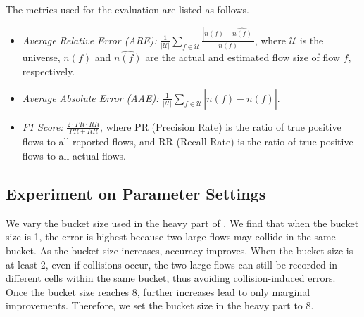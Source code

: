 %
The metrics used for the evaluation are listed as follows.
\begin{itemize}[leftmargin=*]
    \item \textit{Average Relative Error (ARE):}
    \(\frac{1}{|\mathcal{U}|} \sum_{f\in\mathcal{U}} \frac{|n(f)-\hat{n(f)}|}{n(f)}\),
    where \(\mathcal{U}\) is the universe, \(n(f)\) and \(\hat{n(f)}\) are the actual and estimated flow size of flow \(f\), respectively.
    \item \textit{Average Absolute Error (AAE):}
    \(\frac{1}{|\mathcal{U}|} \sum_{f\in\mathcal{U}} |n(f)-\hat{n(f)}|\).
    \item \textit{F1 Score:} \(\frac{2\cdot PR\cdot RR}{PR+RR}\), where PR (Precision Rate) is the ratio of true positive flows to all reported flows, and RR (Recall Rate) is the ratio of true positive flows to all actual flows.
\end{itemize}




\subsection{Experiment on Parameter Settings}





%
We vary the bucket size used in the heavy part of \alg{}. We find that when the bucket size is 1, the error is highest because two large flows may collide in the same bucket. As the bucket size increases, accuracy improves. When the bucket size is at least 2, even if collisions occur, the two large flows can still be recorded in different cells within the same bucket, thus avoiding collision-induced errors. Once the bucket size reaches 8, further increases lead to only marginal improvements.
%
Therefore, we set the bucket size in the heavy part to 8.




